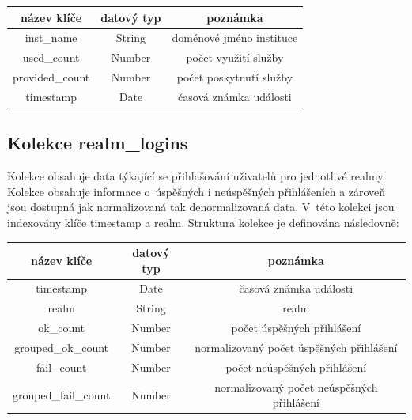 \documentclass[thesis=M,czech]{FITthesis}[2012/06/26]
\begin{document}
      \begin{center}
        \begin{tabular}{ | c | c | c | }
          \hline
            název klíče     & datový typ & poznámka                   \\ \hline
            inst\_name      & String     & doménové jméno instituce   \\ \hline
            used\_count     & Number     & počet využití služby       \\ \hline
            provided\_count & Number     & počet poskytnutí služby    \\ \hline
            timestamp       & Date       & časová známka události     \\
          \hline
        \end{tabular}
      \end{center}
    
    \subsection{Kolekce realm\_logins}
    
      Kolekce obsahuje data týkající se přihlašování uživatelů pro jednotlivé realmy.
      Kolekce obsahuje informace o~úspěšných i neúspěšných přihlášeních
      a zároveň jsou dostupná jak normalizovaná tak denormalizovaná data.
      V~této kolekci jsou indexovány klíče timestamp a realm.
      Struktura kolekce je definována následovně:
      
      \begin{center}
        \begin{tabular}{ | c | c | c | }
          \hline
            název klíče          & datový typ & poznámka                                   \\ \hline
            timestamp            & Date       & časová známka události                     \\ \hline
            realm                & String     & realm                                      \\ \hline
            ok\_count            & Number     & počet úspěšných přihlášení                 \\ \hline
            grouped\_ok\_count   & Number     & normalizovaný počet úspěšných přihlášení   \\ \hline
            fail\_count          & Number     & počet neúspěšných přihlášení               \\ \hline
            grouped\_fail\_count & Number     & normalizovaný počet neúspěšných přihlášení \\
          \hline
        \end{tabular}
      \end{center}
\end{document}
